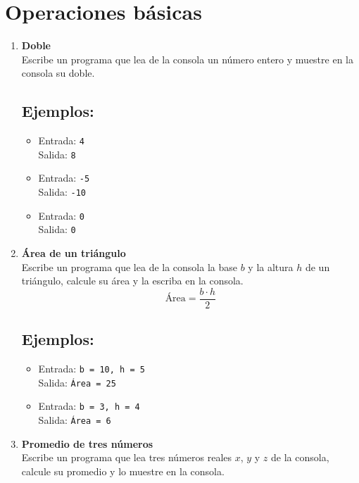 \section{Operaciones básicas}
\begin{enumerate}
    \item \textbf{Doble}\\
    Escribe un programa que lea de la consola un número entero y muestre en la consola su doble.
    \subsection*{Ejemplos:}
    \begin{itemize}
        \item Entrada: \texttt{4}\\
              Salida: \texttt{8}
        \item Entrada: \texttt{-5}\\
              Salida: \texttt{-10}
        \item Entrada: \texttt{0}\\
              Salida: \texttt{0}
    \end{itemize}
    
    \item \textbf{Área de un triángulo}\\
    Escribe un programa que lea de la consola la base \(b\) y la altura \(h\) de un triángulo, calcule su área y la escriba en la consola.\\
    \[
    \text{Área} = \frac{b \cdot h}{2}
    \]
    \subsection*{Ejemplos:}
    \begin{itemize}
        \item Entrada: \texttt{b = 10, h = 5}\\
              Salida: \texttt{Área = 25}
        \item Entrada: \texttt{b = 3, h = 4}\\
              Salida: \texttt{Área = 6}
    \end{itemize}

    \item \textbf{Promedio de tres números}\\
    Escribe un programa que lea tres números reales \(x\), \(y\) y \(z\) de la consola, calcule su promedio y lo muestre en la consola.

\end{enumerate}
